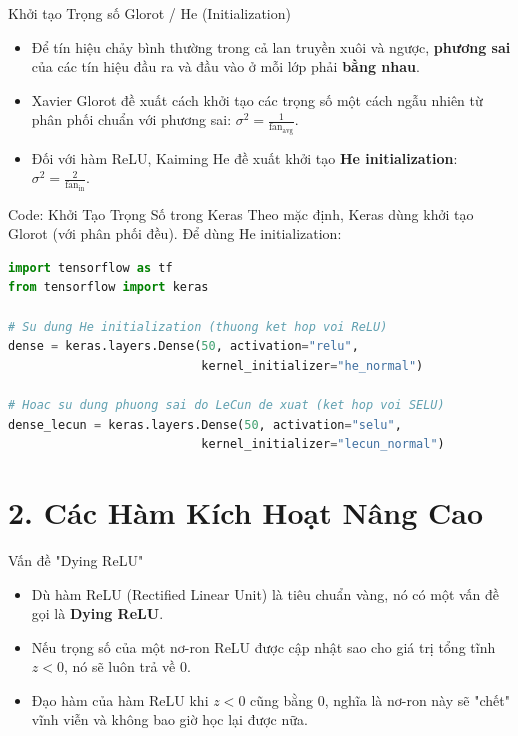 \documentclass[aspectratio=169]{beamer}
\begin{document}
\begin{frame}{Khởi tạo Trọng số Glorot / He (Initialization)}
    \begin{itemize}
        \item Để tín hiệu chảy bình thường trong cả lan truyền xuôi và ngược, \textbf{phương sai} của các tín hiệu đầu ra và đầu vào ở mỗi lớp phải \textbf{bằng nhau}.
        \item Xavier Glorot đề xuất cách khởi tạo các trọng số một cách ngẫu nhiên từ phân phối chuẩn với phương sai: $\sigma^2 = \frac{1}{\text{fan}_{\text{avg}}}$.
        \item Đối với hàm ReLU, Kaiming He đề xuất khởi tạo \textbf{He initialization}: $\sigma^2 = \frac{2}{\text{fan}_{\text{in}}}$.
    \end{itemize}
\end{frame}

\begin{frame}[fragile]{Code: Khởi Tạo Trọng Số trong Keras}
    Theo mặc định, Keras dùng khởi tạo Glorot (với phân phối đều). Để dùng He initialization:
\begin{lstlisting}[language=Python]
import tensorflow as tf
from tensorflow import keras

# Su dung He initialization (thuong ket hop voi ReLU)
dense = keras.layers.Dense(50, activation="relu",
                           kernel_initializer="he_normal")

# Hoac su dung phuong sai do LeCun de xuat (ket hop voi SELU)
dense_lecun = keras.layers.Dense(50, activation="selu",
                           kernel_initializer="lecun_normal")
\end{lstlisting}
\end{frame}

\section{2. Các Hàm Kích Hoạt Nâng Cao}

\begin{frame}{Vấn đề "Dying ReLU"}
    \begin{itemize}
        \item Dù hàm ReLU (Rectified Linear Unit) là tiêu chuẩn vàng, nó có một vấn đề gọi là \textbf{Dying ReLU}.
        \item Nếu trọng số của một nơ-ron ReLU được cập nhật sao cho giá trị tổng tĩnh $z < 0$, nó sẽ luôn trả về 0. 
        \item Đạo hàm của hàm ReLU khi $z < 0$ cũng bằng 0, nghĩa là nơ-ron này sẽ "chết" vĩnh viễn và không bao giờ học lại được nữa.
    \end{itemize}
\end{frame}
\end{document}
